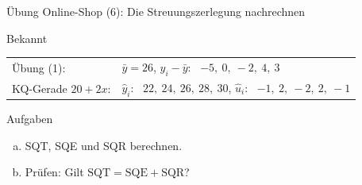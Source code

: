 \documentclass[aspectratio=169,11pt]{beamer}
\begin{document}
\begin{frame}{Übung Online-Shop (6): Die Streuungszerlegung nachrechnen}
  \begin{block}{Bekannt}
    \renewcommand{\arraystretch}{1.25}
    \begin{tabular}{@{}ll@{}}
      Übung (1): & $\bar{y} = 26$, \quad $y_i - \bar{y}$: \ $-5,\ 0,\ -2,\ 4,\ 3$ \\
      KQ-Gerade $20 + 2x$: & $\hat{y}_i$: \ $22,\ 24,\ 26,\ 28,\ 30$, \quad $\hat{u}_i$: \ $-1,\ 2,\ -2,\ 2,\ -1$
    \end{tabular}
  \end{block}

  \medskip

  \begin{exampleblock}{Aufgaben}
    \begin{enumerate}[a)]
      \setlength{\itemsep}{2pt}
      \item SQT, SQE und SQR berechnen.
      \item Prüfen: Gilt $\text{SQT} = \text{SQE} + \text{SQR}$?
    \end{enumerate}
  \end{exampleblock}

  \medskip

  \begin{center}
  \end{center}
\end{frame}
\end{document}
